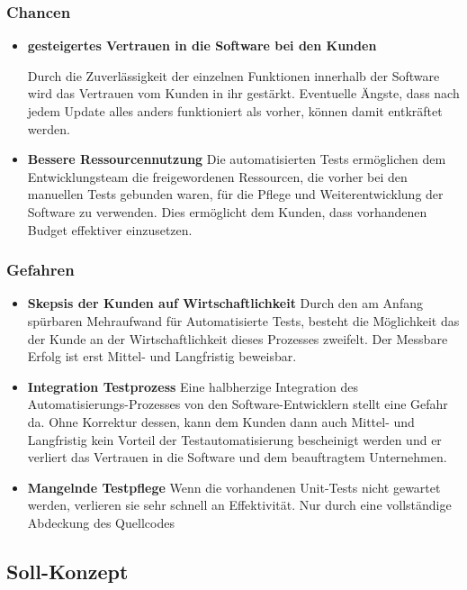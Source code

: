 \subsubsection{Chancen}
\begin{itemize}	
	\item \textbf{gesteigertes Vertrauen in die Software bei den Kunden}
	
	Durch die Zuverlässigkeit der einzelnen Funktionen innerhalb der Software wird das Vertrauen vom Kunden in ihr gestärkt. Eventuelle Ängste, dass nach jedem Update alles anders funktioniert als vorher, können damit entkräftet werden.
	
	\item \textbf{Bessere Ressourcennutzung}
	Die automatisierten Tests ermöglichen dem Entwicklungsteam die freigewordenen Ressourcen, die vorher bei den manuellen Tests gebunden waren, für die Pflege und Weiterentwicklung der Software zu verwenden. Dies ermöglicht dem Kunden, dass vorhandenen Budget effektiver einzusetzen.
	
\end{itemize}
	\subsubsection{Gefahren}
\begin{itemize}	
	\item \textbf{Skepsis der Kunden auf Wirtschaftlichkeit}
	Durch den am Anfang spürbaren Mehraufwand für Automatisierte Tests, besteht die Möglichkeit das der Kunde an der Wirtschaftlichkeit dieses Prozesses zweifelt. Der Messbare Erfolg ist erst Mittel- und Langfristig beweisbar.
	
	\item \textbf{Integration Testprozess}
	Eine halbherzige Integration des Automatisierungs-Prozesses von den Software-Entwicklern stellt eine Gefahr da. Ohne Korrektur dessen, kann dem Kunden dann auch Mittel- und Langfristig kein Vorteil der Testautomatisierung bescheinigt werden und er verliert das Vertrauen in die Software und dem beauftragtem Unternehmen.
	
	\item \textbf{Mangelnde Testpflege}
	Wenn die vorhandenen Unit-Tests nicht gewartet werden, verlieren sie sehr schnell an Effektivität. Nur durch eine vollständige Abdeckung des Quellcodes 
	
	
\end{itemize}

\subsection{Soll-Konzept}
